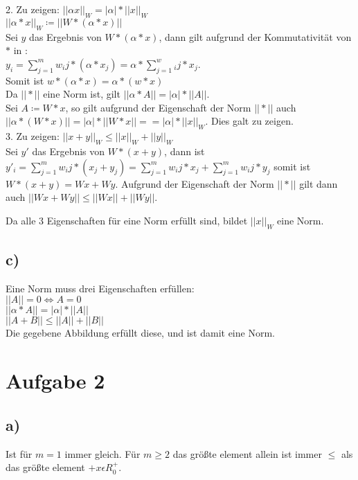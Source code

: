 \documentclass[10pt,a4paper]{article}
\begin{document}
2. Zu zeigen: $||\alpha x||_W = |\alpha|*||x||_W$\\

$||\alpha*x||_W \coloneqq || W * ( \alpha * x )||$\\
Sei $y$ das Ergebnis von $W*(\alpha * x)$, dann gilt aufgrund der Kommutativität von $*$ in :\\ 
$y_i = \sum_{j=1}^m w_ij * (\alpha * x_j) = \alpha*\sum_{j=1}^w_ij*x_j$.\\ 
Somit ist $w*(\alpha * x) = \alpha *(w*x)$\\

Da $||*||$ eine Norm ist, gilt $||\alpha*A|| = |\alpha|*||A||$.\\
Sei $A\coloneqq W*x$, so gilt aufgrund der Eigenschaft der Norm $||*||$ auch $||\alpha*(W*x)|| = |\alpha|*||W*x|| =  = |\alpha|*||x||_W$. Dies galt zu zeigen.\\

3. Zu zeigen: $||x+y||_W \leq ||x||_W +||y||_W$\\

Sei $y'$ das Ergebnis von $W*(x+y)$, dann ist $y'_i = \sum_{j=1}^m w_ij * ( x_j + y_j ) = \sum_{j=1}^m w_ij * x_j + \sum_{j=1}^m w_ij * y_j$ somit ist $W*(x+y) = Wx + Wy$. Aufgrund der Eigenschaft der Norm $||*||$ gilt dann auch $||Wx + Wy|| \leq ||Wx|| + ||Wy||$.

Da alle 3 Eigenschaften für eine Norm erfüllt sind, bildet $||x||_W$ eine Norm.

\subsection*{c)}
Eine Norm muss drei Eigenschaften erfüllen:\\
$||A|| = 0 \Leftrightarrow A = 0$\\
$||\alpha*A|| = |\alpha|*||A||$\\
$||A+B|| \leq ||A|| + ||B||$\\
Die gegebene Abbildung erfüllt diese, und ist damit eine Norm.

\section*{Aufgabe 2}
\subsection*{a)}
Ist für $m=1$ immer gleich.
Für $m \geq 2$ das größte element allein ist immer $\leq$ als das größte element $+ x\epsilon R_0^+$.
\end{document}
